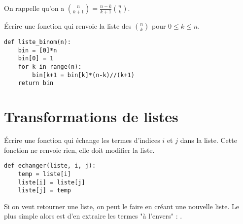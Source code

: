 On rappelle qu'on a $\displaystyle  \binom n{k+1} = \frac{n-k}{k+1} \binom nk$.
\begin{Exercise}[title= {Coefficients binomiaux, bis}]
Écrire une fonction  qui renvoie la liste des $\binom nk$ pour $0\le k \le n$.
\end{Exercise}
\begin{Answer} 
\begin{lstlisting}
def liste_binom(n):
    bin = [0]*n
    bin[0] = 1
    for k in range(n):
        bin[k+1 = bin[k]*(n-k)//(k+1)
    return bin
\end{lstlisting}
\end{Answer}
\section{Transformations de listes} 
\begin{Exercise}[title= Échanges]
Écrire une fonction  qui échange les termes d'indices $i$ et $j$ dans la liste. Cette fonction ne renvoie rien, elle doit modifier la liste.
\end{Exercise}
\begin{Answer} 
\begin{lstlisting}
def echanger(liste, i, j):
    temp = liste[i]
    liste[i] = liste[j]
    liste[j] = temp
\end{lstlisting}
\medskip
\end{Answer}

\medskip

Si on veut retourner une liste, on peut le faire en créant une nouvelle liste. Le plus simple alors est d'en extraire les termes "à l'envers" : .

